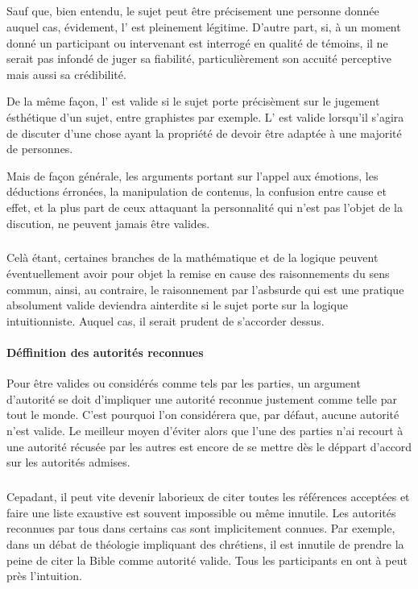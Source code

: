 \subparagraph{}
Sauf que, bien entendu, le sujet peut être précisement une personne donnée auquel cas, évidement, l’ est pleinement légitime. D’autre part, si, à un moment donné un participant ou intervenant est interrogé en qualité de témoins, il ne serait pas infondé de juger sa fiabilité, particulièrement son accuité perceptive mais aussi sa crédibilité.

De la même façon, l’ est valide si le sujet porte précisèment sur le jugement ésthétique d’un sujet, entre graphistes par exemple. L’ est valide lorsqu’il s’agira de discuter d’une chose ayant la propriété de devoir être adaptée à une majorité de personnes.

Mais de façon générale, les arguments portant sur l’appel aux émotions, les déductions érronées, la manipulation de contenus, la confusion entre cause et effet, et la plus part de ceux attaquant la personnalité qui n’est pas l’objet de la discution, ne peuvent jamais être valides.

\subparagraph{}
Celà étant, certaines branches de la mathématique et de la logique peuvent éventuellement avoir pour objet la remise en cause des raisonnements du sens commun, ainsi, au contraire, le raisonnement par l’asbsurde qui est une pratique absolument valide deviendra ainterdite si le sujet porte sur la logique intuitionniste. Auquel cas, il serait prudent de s’accorder dessus.

\paragraph{Déffinition des autorités reconnues} Pour être valides ou considérés comme tels par les parties, un argument d’autorité se doit d’impliquer une autorité reconnue justement comme telle par tout le monde. C’est pourquoi l’on considérera que, par défaut, aucune autorité n’est valide. Le meilleur moyen d’éviter alors que l’une des parties n’ai recourt à une autorité récusée par les autres est encore de se mettre dès le déppart d’accord sur les autorités admises.

\subparagraph{}
Cepadant, il peut vite devenir laborieux de citer toutes les références acceptées et faire une liste exaustive est souvent impossible ou même innutile. Les autorités reconnues par tous dans certains cas sont implicitement connues. Par exemple, dans un débat de théologie impliquant des chrétiens, il est innutile de prendre la peine de citer la Bible comme autorité valide. Tous les participants en ont à peut près l’intuition.

